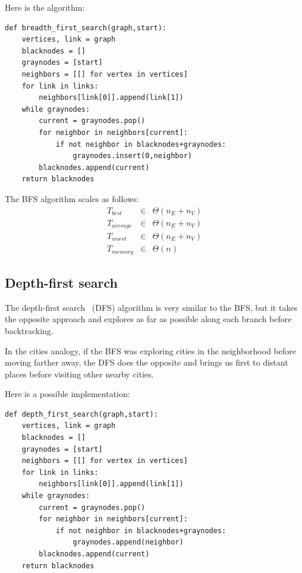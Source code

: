 \documentclass[justified,sixbynine]{tufte-book}
\def\ft{\small\tt}
\theoremstyle{plain}%
\theoremstyle{definition}
\theoremstyle{remark}
\begin{document}
\begin{fullwidth}
Here is the algorithm:

\begin{lstlisting}[caption={in file: {\ft nlib.py}}]
def breadth_first_search(graph,start):
    vertices, link = graph
    blacknodes = []
    graynodes = [start]
    neighbors = [[] for vertex in vertices]
    for link in links:
        neighbors[link[0]].append(link[1])
    while graynodes:
        current = graynodes.pop()
        for neighbor in neighbors[current]:
            if not neighbor in blacknodes+graynodes:
                graynodes.insert(0,neighbor)
        blacknodes.append(current)
    return blacknodes
\end{lstlisting}

The BFS algorithm scales as follows:
\begin{eqnarray}
T_{best} &\in &\Theta (n_E+n_V) \\
T_{average} &\in &\Theta (n_E+n_V) \\
T_{worst} &\in &\Theta (n_E+n_V) \\
T_{memory} &\in &\Theta (n)
\end{eqnarray}

\subsection{Depth-first search}


The depth-first search~\cite{dfs} (DFS) algorithm is very similar to the BFS, but it takes the opposite approach and explores as far as possible along each branch before backtracking.

In the cities analogy, if the BFS was exploring cities in the neighborhood before moving farther away, the DFS does the opposite and brings us first to distant places before visiting other nearby cities.

Here is a possible implementation:

\begin{lstlisting}[caption={in file: {\ft nlib.py}}]
def depth_first_search(graph,start):
    vertices, link = graph
    blacknodes = []
    graynodes = [start]
    neighbors = [[] for vertex in vertices]
    for link in links:
        neighbors[link[0]].append(link[1])
    while graynodes:
        current = graynodes.pop()
        for neighbor in neighbors[current]:
            if not neighbor in blacknodes+graynodes:
                graynodes.append(neighbor)
        blacknodes.append(current)
    return blacknodes
\end{lstlisting}


\end{fullwidth}
\end{document}
